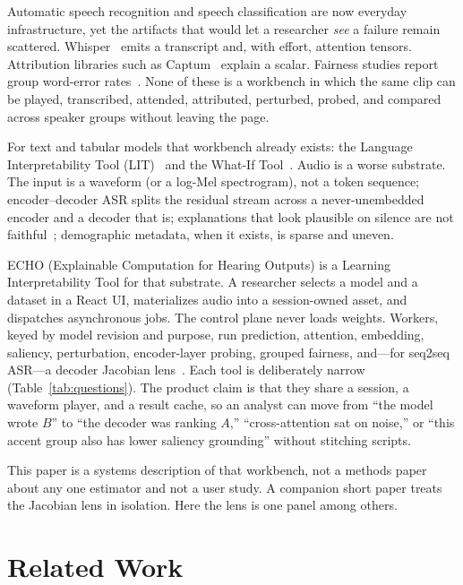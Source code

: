 \documentclass[conference]{IEEEtran}
\begin{document}
Automatic speech recognition and speech classification are now everyday infrastructure, yet the artifacts that would let a researcher \emph{see} a failure remain scattered. Whisper~\cite{radford2023whisper} emits a transcript and, with effort, attention tensors. Attribution libraries such as Captum~\cite{kokhlikyan2020captum} explain a scalar. Fairness studies report group word-error rates~\cite{koenecke2020racial}. None of these is a workbench in which the same clip can be played, transcribed, attended, attributed, perturbed, probed, and compared across speaker groups without leaving the page.

For text and tabular models that workbench already exists: the Language Interpretability Tool (LIT)~\cite{tenney2020lit} and the What-If Tool~\cite{wexler2019whatif}. Audio is a worse substrate. The input is a waveform (or a log-Mel spectrogram), not a token sequence; encoder--decoder ASR splits the residual stream across a never-unembedded encoder and a decoder that is; explanations that look plausible on silence are not faithful~\cite{jacovi2020faithfulness}; demographic metadata, when it exists, is sparse and uneven.

ECHO (Explainable Computation for Hearing Outputs) is a Learning Interpretability Tool for that substrate. A researcher selects a model and a dataset in a React UI, materializes audio into a session-owned asset, and dispatches asynchronous jobs. The control plane never loads weights. Workers, keyed by model revision and purpose, run prediction, attention, embedding, saliency, perturbation, encoder-layer probing, grouped fairness, and---for seq2seq ASR---a decoder Jacobian lens~\cite{gurnee2026workspace}. Each tool is deliberately narrow (Table~\ref{tab:questions}). The product claim is that they share a session, a waveform player, and a result cache, so an analyst can move from ``the model wrote $B$'' to ``the decoder was ranking $A$,'' ``cross-attention sat on noise,'' or ``this accent group also has lower saliency grounding'' without stitching scripts.

This paper is a systems description of that workbench, not a methods paper about any one estimator and not a user study. A companion short paper treats the Jacobian lens in isolation. Here the lens is one panel among others.

\section{Related Work}
\end{document}
